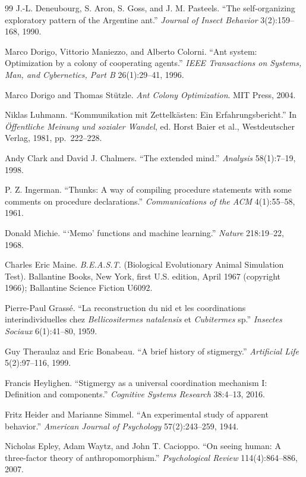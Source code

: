 \documentclass[11pt]{article}
\theoremstyle{remark}
\begin{document}
\begin{thebibliography}{99}
 J.-L. Deneubourg, S. Aron, S. Goss, and J. M. Pasteels. ``The self-organizing exploratory pattern of the Argentine ant.'' \emph{Journal of Insect Behavior} 3(2):159--168, 1990.

 Marco Dorigo, Vittorio Maniezzo, and Alberto Colorni. ``Ant system: Optimization by a colony of cooperating agents.'' \emph{IEEE Transactions on Systems, Man, and Cybernetics, Part B} 26(1):29--41, 1996.

 Marco Dorigo and Thomas St\"utzle. \emph{Ant Colony Optimization}. MIT Press, 2004.

 Niklas Luhmann. ``Kommunikation mit Zettelk\"asten: Ein Erfahrungsbericht.'' In \emph{\"Offentliche Meinung und sozialer Wandel}, ed. Horst Baier et al., Westdeutscher Verlag, 1981, pp.\ 222--228.

 Andy Clark and David J. Chalmers. ``The extended mind.'' \emph{Analysis} 58(1):7--19, 1998.

 P. Z. Ingerman. ``Thunks: A way of compiling procedure statements with some comments on procedure declarations.'' \emph{Communications of the ACM} 4(1):55--58, 1961.

 Donald Michie. ```Memo' functions and machine learning.'' \emph{Nature} 218:19--22, 1968.

 Charles Eric Maine. \emph{B.E.A.S.T.} (Biological Evolutionary Animal Simulation Test). Ballantine Books, New York, first U.S. edition, April 1967 (copyright 1966); Ballantine Science Fiction U6092.

 Pierre-Paul Grass\'e. ``La reconstruction du nid et les coordinations interindividuelles chez \emph{Bellicositermes natalensis} et \emph{Cubitermes} sp.'' \emph{Insectes Sociaux} 6(1):41--80, 1959.

 Guy Theraulaz and Eric Bonabeau. ``A brief history of stigmergy.'' \emph{Artificial Life} 5(2):97--116, 1999.

 Francis Heylighen. ``Stigmergy as a universal coordination mechanism I: Definition and components.'' \emph{Cognitive Systems Research} 38:4--13, 2016.

 Fritz Heider and Marianne Simmel. ``An experimental study of apparent behavior.'' \emph{American Journal of Psychology} 57(2):243--259, 1944.

 Nicholas Epley, Adam Waytz, and John T. Cacioppo. ``On seeing human: A three-factor theory of anthropomorphism.'' \emph{Psychological Review} 114(4):864--886, 2007.


\end{thebibliography}
\end{document}
